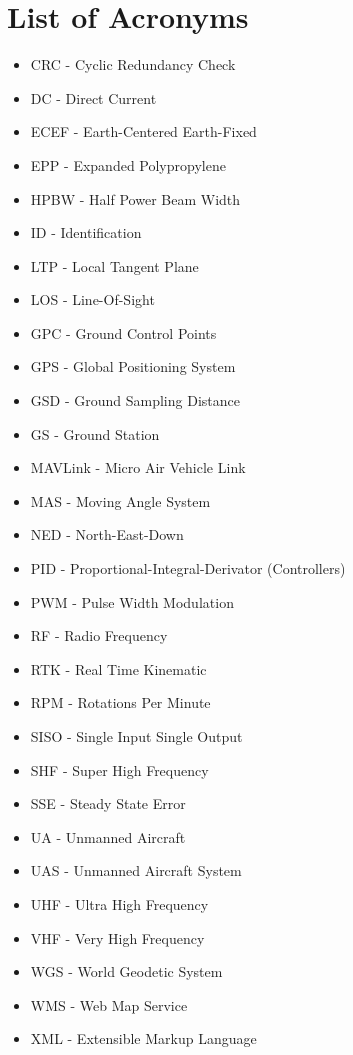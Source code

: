 \section*{List of Acronyms}
\begin{itemize}
	\item CRC - Cyclic Redundancy Check
	\item DC - Direct Current
	\item ECEF - Earth-Centered Earth-Fixed
	\item EPP - Expanded Polypropylene
	\item HPBW - Half Power Beam Width
	\item ID - Identification
	\item LTP - Local Tangent Plane
	\item LOS - Line-Of-Sight
	\item GPC - Ground Control Points
	\item GPS - Global Positioning System
	\item GSD - Ground Sampling Distance
	\item GS - Ground Station
	\item MAVLink - Micro Air Vehicle Link
	\item MAS - Moving Angle System
	\item NED - North-East-Down
	\item PID - Proportional-Integral-Derivator (Controllers)
	\item PWM - Pulse Width Modulation
	\item RF - Radio Frequency
	\item RTK - Real Time Kinematic
	\item RPM - Rotations Per Minute
	\item SISO - Single Input Single Output
	\item SHF - Super High Frequency
	\item SSE - Steady State Error
	\item UA - Unmanned Aircraft
	\item UAS - Unmanned Aircraft System
	\item UHF - Ultra High Frequency
	\item VHF - Very High Frequency
	\item WGS - World Geodetic System
	\item WMS - Web Map Service
	\item XML - Extensible Markup Language
\end{itemize}